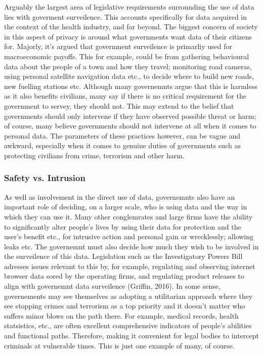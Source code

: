 \documentclass[11pt, english]{article}
\begin{document}
	Arguably the largest area of legislative requirements surrounding the use of data lies with goverment surveilence. This accounts specifically for data acquired in the context of the health industry, and far beyond. The biggest concern of society in this aspect of privacy is around what governments want data of their citizens for. Majorly, it's argued that government surveilence is primarliy used for macroeconomic payoffs. This for example, could be from gathering behavioural data about the people of a town and how they travel; monitoring road cameras, using personal satellite navigation data etc., to decide where to build new roads, new fuelling stations etc. Although many governemnts argue that this is harmless as it also benefits civilians, many say if there is no critical requirement for the government to servey, they should not. This may extend to the belief that governments should only intervene if they have observed possible threat or harm; of course, many believe governments should not intervene at all when it comes to personal data. The parameters of these practices however, can be vague and awkward, especially when it comes to genuine duties of governments such as protecting civilians from crime, terrorism and other harm.

		\subsubsection{Safety vs. Intrusion}

	As well as involvement in the direct use of data, governemnts also have an important role of deciding, on a larger scale, who is using data and the way in which they can use it. Many other conglemrates and large firms have the ability to significantly alter people's lives by using their data for protection and the user's benefit etc., for intrusive action and personal gain or wrecklessly; allowing leaks etc. The governemnt must also decide how much they wish to be involved in the surveilence of this data. Legislation such as the Investigatory Powers Bill adresses issues relevant to this by, for example, regulating and observing internet browser data sored by the operating firms, and regulating product releases to align with governemnt data surveilence (Griffin, 2016). In some sense, governements may see themselves as adopting a utilitarian approach where they see stopping crimes and terrorism as a top priority and it doesn't matter who suffers minor blows on the path there. For example, medical records, health statsistics, etc., are often excellent comprehensive indicators of people's abilities and functional paths. Therefore, making it convenient for legal bodies to intercept criminals at vulnerable times. This is just one example of many, of course.\\
\end{document}
